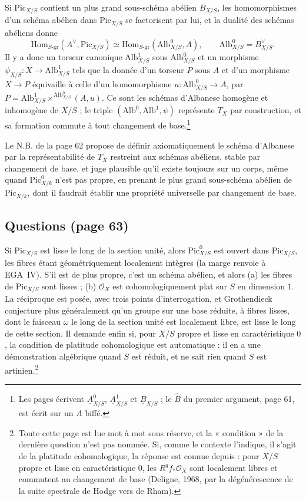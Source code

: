 \documentclass[11pt,a4paper]{article}
\begin{document}
Si $\mathrm{Pic}_{X/S}$ contient un plus grand sous-schéma abélien $B_{X/S}$,
les homomorphismes d'un schéma abélien dans $\mathrm{Pic}_{X/S}$ se factorisent
par lui, et la dualité des schémas abéliens donne
\[
\mathrm{Hom}_{S\text{-gr}}(A^\vee, \mathrm{Pic}_{X/S}) \simeq \mathrm{Hom}_{S\text{-gr}}(\mathrm{Alb}^0_{X/S}, A),
\qquad \mathrm{Alb}^0_{X/S} = B_{X/S}^\vee .
\]
Il y a donc un torseur canonique $\mathrm{Alb}^1_{X/S}$ sous
$\mathrm{Alb}^0_{X/S}$ et un morphisme $\psi_{X/S} \colon X \to \mathrm{Alb}^1_{X/S}$
tels que la donnée d'un torseur $P$ sous $A$ et d'un morphisme $X \to P$
équivaille à celle d'un homomorphisme $u \colon \mathrm{Alb}^0_{X/S} \to A$,
par $P = \mathrm{Alb}^1_{X/S} \times^{\mathrm{Alb}^0_{X/S}} (A, u)$. Ce sont
les schémas d'Albanese homogène et inhomogène de $X/S$ ; le triple
$(\mathrm{Alb}^0, \mathrm{Alb}^1, \psi)$ représente $T_X$ par construction, et
sa formation commute à tout changement de base.\footnote{Les pages écrivent
$\underline{A}^0_{X/S}$, $\underline{A}^1_{X/S}$ et
$\underline{B}_{X/S}$ ; le $\hat{B}$ du premier argument, page 61, est écrit
sur un $A$ biffé.}

Le N.B. de la page 62 propose de définir axiomatiquement le schéma d'Albanese
par la représentabilité de $T_X$ restreint aux schémas abéliens, stable par
changement de base, et juge plausible qu'il existe toujours sur un corps, même
quand $\mathrm{Pic}^0_{X/k}$ n'est pas propre, en prenant le plus grand
sous-schéma abélien de $\mathrm{Pic}_{X/k}$, dont il faudrait établir une
propriété universelle par changement de base.

\subsection*{Questions (page 63)}

Si $\mathrm{Pic}_{X/S}$ est lisse le long de la section unité, alors
$\mathrm{Pic}^0_{X/S}$ est ouvert dans $\mathrm{Pic}_{X/S}$, les fibres étant
géométriquement localement intègres (la marge renvoie à EGA~IV). S'il est de plus propre, c'est un
schéma abélien, et alors (a) les fibres de $\mathrm{Pic}_{X/S}$ sont lisses ;
(b) $\mathcal{O}_X$ est cohomologiquement plat sur $S$ en dimension $1$. La
réciproque est posée, avec trois points d'interrogation, et Grothendieck
conjecture plus généralement qu'un groupe sur une base réduite, à fibres
lisses, dont le faisceau $\omega$ le long de la section unité est localement
libre, est lisse le long de cette section. Il demande enfin si, pour $X/S$
propre et lisse en caractéristique $0$, la condition de platitude
cohomologique est automatique : il en a une démonstration algébrique quand $S$
est réduit, et ne sait rien quand $S$ est artinien.\footnote{Toute cette page
est lue mot à mot sous réserve, et la « condition » de la dernière question
n'est pas nommée. Si, comme le contexte l'indique, il s'agit de la platitude
cohomologique, la réponse est connue depuis : pour $X/S$ propre et lisse en caractéristique $0$, les
$R^q f_*\mathcal{O}_X$ sont localement libres et commutent au changement de
base (Deligne, 1968, par la dégénérescence de la suite spectrale de Hodge vers
de Rham).}
\end{document}
